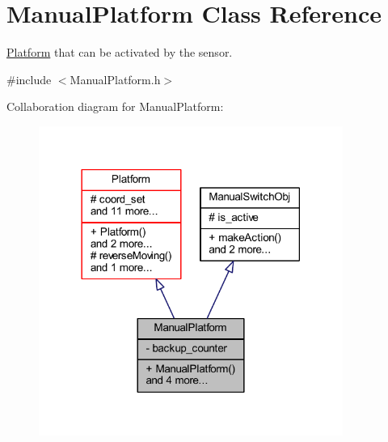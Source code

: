 \hypertarget{class_manual_platform}{}\section{Manual\+Platform Class Reference}
\label{class_manual_platform}


\hyperlink{class_platform}{Platform} that can be activated by the sensor.  




{\ttfamily \#include $<$Manual\+Platform.\+h$>$}



Collaboration diagram for Manual\+Platform\+:\nopagebreak
\begin{figure}[H]
\begin{center}
\leavevmode
\includegraphics[width=282pt]{class_manual_platform__coll__graph}
\end{center}
\end{figure}
